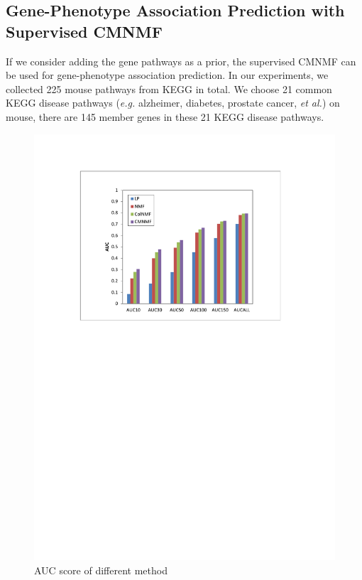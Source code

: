 \documentclass{bmcart}
\begin{document}
\subsection*{\textbf{Gene-Phenotype Association Prediction with Supervised CMNMF}}
If we consider adding the gene pathways as a prior, the supervised CMNMF can be used for gene-phenotype association prediction. In our experiments, we collected 225 mouse pathways from KEGG in total. We choose 21 common KEGG disease pathways (\emph{e.g.} alzheimer, diabetes, prostate cancer, \emph{et al.}) on mouse, there are 145 member genes in these 21 KEGG disease pathways.
\begin{figure}[!h]
  \begin{minipage}[t]{0.9\linewidth}
    \includegraphics[width=\linewidth,origin = l]{DrawPictures/auc_excel.pdf}
  \end{minipage}
  \caption{AUC score of different method} \label{fig:AUC}
\end{figure}
\end{document}

